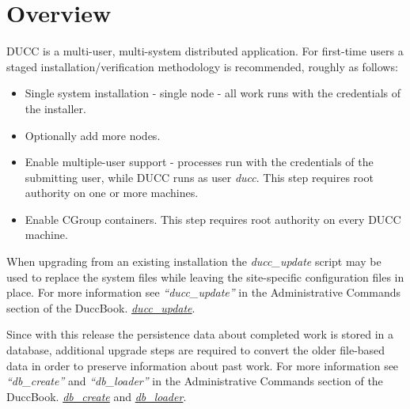 % 
% 
% 
% 
\section{Overview}

DUCC is a multi-user, multi-system distributed application.
For first-time users a staged installation/verification methodology is recommended,
roughly as follows:

\begin{itemize}
    \item Single system installation - single node - all work runs with the credentials of the installer.
      
    \item Optionally add more nodes. 
      
    \item Enable multiple-user support - processes run with the credentials of the submitting user,
      while DUCC runs as user {\em ducc}.
      This step requires root authority on one or more machines.
      
    \item Enable CGroup containers. This step requires root authority on every DUCC machine.
\end{itemize}

When upgrading from an existing installation the {\em ducc\_update} script may be used
to replace the system files while leaving the site-specific configuration files in place. 
For more information see
\ifdefined\DUCCSTANDALONE
{\em ``ducc\_update''} in the Administrative Commands section of the DuccBook. 
\else
\hyperref[subsec:admin.ducc-update] {\em ducc\_update}. 
\fi

Since with this release the persistence data about completed work is stored in a database, 
additional upgrade steps are required to convert the older file-based data in order to preserve information 
about past work. 
For more information see
\ifdefined\DUCCSTANDALONE
{\em ``db\_create''} and {\em ``db\_loader''} in the Administrative Commands section of the DuccBook. 
\else
\hyperref[subsec:admin.db-create] {\em db\_create} and \hyperref[subsec:admin.db-loader] {\em db\_loader}. 
\fi


